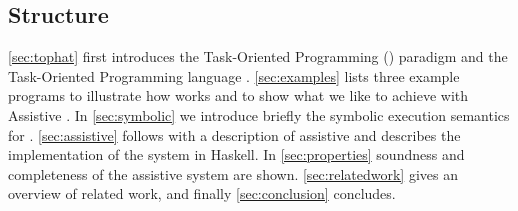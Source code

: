 \subsection{Structure}

\cref{sec:tophat} first introduces the Task-Oriented Programming (\TOP) paradigm and the Task-Oriented Programming language \TOPHAT.
\cref{sec:examples} lists three example programs to illustrate how \TOPHAT works and to show what we like to achieve with Assistive \TOPHAT.
In \cref{sec:symbolic} we introduce briefly the symbolic execution semantics for \TOPHAT.
\cref{sec:assistive} follows with a description of assistive \TOPHAT
and describes the implementation of the system in Haskell.
In \cref{sec:properties} soundness and completeness of the assistive system are shown.
\cref{sec:relatedwork} gives an overview of related work, and finally \cref{sec:conclusion} concludes.
